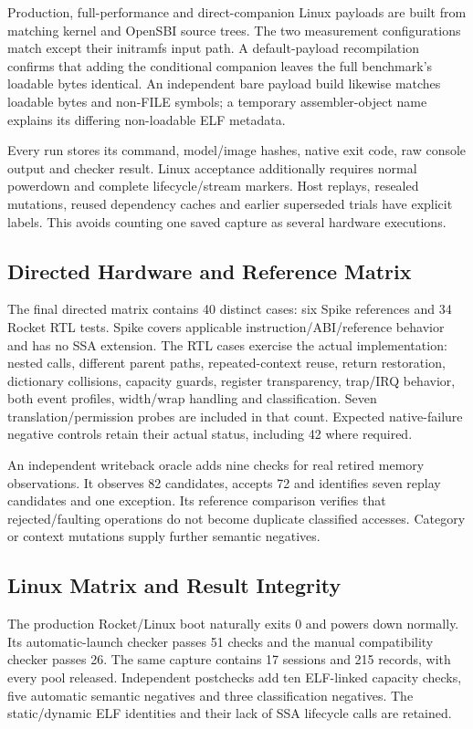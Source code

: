 Production, full-performance and direct-companion Linux payloads are built from matching kernel and OpenSBI source trees. The two measurement configurations match except their initramfs input path. A default-payload recompilation confirms that adding the conditional companion leaves the full benchmark's loadable bytes identical. An independent bare payload build likewise matches loadable bytes and non-FILE symbols; a temporary assembler-object name explains its differing non-loadable ELF metadata.

Every run stores its command, model/image hashes, native exit code, raw console output and checker result. Linux acceptance additionally requires normal powerdown and complete lifecycle/stream markers. Host replays, resealed mutations, reused dependency caches and earlier superseded trials have explicit labels. This avoids counting one saved capture as several hardware executions.

\subsection{Directed Hardware and Reference Matrix}
The final directed matrix contains 40 distinct cases: six Spike references and 34 Rocket RTL tests. Spike covers applicable instruction/ABI/reference behavior and has no SSA extension. The RTL cases exercise the actual implementation: nested calls, different parent paths, repeated-context reuse, return restoration, dictionary collisions, capacity guards, register transparency, trap/IRQ behavior, both event profiles, width/wrap handling and classification. Seven translation/permission probes are included in that count. Expected native-failure negative controls retain their actual status, including 42 where required.

An independent writeback oracle adds nine checks for real retired memory observations. It observes 82 candidates, accepts 72 and identifies seven replay candidates and one exception. Its reference comparison verifies that rejected/faulting operations do not become duplicate classified accesses. Category or context mutations supply further semantic negatives.

\subsection{Linux Matrix and Result Integrity}
The production Rocket/Linux boot naturally exits 0 and powers down normally. Its automatic-launch checker passes 51 checks and the manual compatibility checker passes 26. The same capture contains 17 sessions and 215 records, with every pool released. Independent postchecks add ten ELF-linked capacity checks, five automatic semantic negatives and three classification negatives. The static/dynamic ELF identities and their lack of SSA lifecycle calls are retained.

